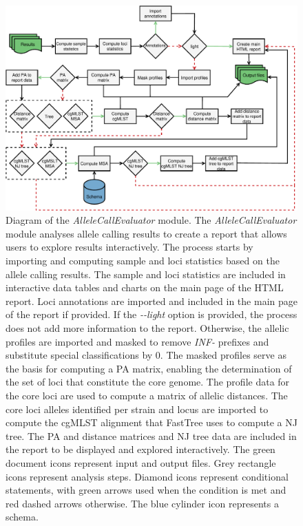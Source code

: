 \newpage
\begin{figure}[h!]
    \centering
    \includegraphics[angle=0,width=\textwidth]{figures/chapter 2/FigureS22.pdf}
    \caption[Diagram of the \textit{AlleleCallEvaluator} module.]{Diagram of the \textit{AlleleCallEvaluator} module. The \textit{AlleleCallEvaluator} module analyses allele calling results to create a report that allows users to explore results interactively. The process starts by importing and computing sample and loci statistics based on the allele calling results. The sample and loci statistics are included in interactive data tables and charts on the main page of the \ac{HTML} report. Loci annotations are imported and included in the main page of the report if provided. If the \textit{-{}-light} option is provided, the process does not add more information to the report. Otherwise, the allelic profiles are imported and masked to remove \textit{INF-} prefixes and substitute special classifications by 0. The masked profiles serve as the basis for computing a \ac{PA} matrix, enabling the determination of the set of loci that constitute the core genome. The profile data for the core loci are used to compute a matrix of allelic distances. The core loci alleles identified per strain and locus are imported to compute the \ac{cgMLST} alignment that FastTree uses to compute a \ac{NJ} tree. The \ac{PA} and distance matrices and \ac{NJ} tree data are included in the report to be displayed and explored interactively. The green document icons represent input and output files. Grey rectangle icons represent analysis steps. Diamond icons represent conditional statements, with green arrows used when the condition is met and red dashed arrows otherwise. The blue cylinder icon represents a schema.}
    \label{fig:chap2_figureS22}
\end{figure}

